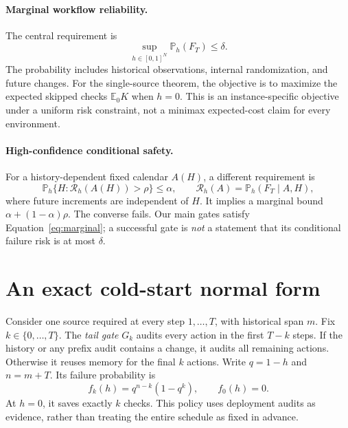 \documentclass{article}
\newcommand{\Pp}{\mathbb P}
\newcommand{\Ee}{\mathbb E}
\newcommand{\1}{\mathbf 1}
\newcommand{\risk}{\mathcal R}
\begin{document}
\paragraph{Marginal workflow reliability.}
The central requirement is
\begin{equation}
\sup_{h\in[0,1]^N}\Pp_h(F_T)\leq\delta.\label{eq:marginal}
\end{equation}
The probability includes historical observations, internal randomization, and future changes. For the single-source theorem, the objective is to maximize the expected skipped checks $\Ee_0 K$ when $h=0$. This is an instance-specific objective under a uniform risk constraint, not a minimax expected-cost claim for every environment.

\paragraph{High-confidence conditional safety.}
For a history-dependent fixed calendar $A(H)$, a different requirement is
\begin{equation}
\Pp_h\{H:\risk_h(A(H))>\rho\}\leq\alpha,
\qquad \risk_h(A)=\Pp_h(F_T\mid A,H),\label{eq:conditional}
\end{equation}
where future increments are independent of $H$. It implies a marginal bound $\alpha+(1-\alpha)\rho$. The converse fails. Our main gates satisfy Equation~\eqref{eq:marginal}; a successful gate is \emph{not} a statement that its conditional failure risk is at most $\delta$.

\section{An exact cold-start normal form}\label{sec:normal}
Consider one source required at every step $1,\ldots,T$, with historical span $m$. Fix $k\in\{0,\ldots,T\}$. The \emph{tail gate} $G_k$ audits every action in the first $T-k$ steps. If the history or any prefix audit contains a change, it audits all remaining actions. Otherwise it reuses memory for the final $k$ actions. Write $q=1-h$ and $n=m+T$. Its failure probability is
\begin{equation}
 f_k(h)=q^{n-k}(1-q^k),\qquad f_0(h)=0.\label{eq:tail}
\end{equation}
At $h=0$, it saves exactly $k$ checks. This policy uses deployment audits as evidence, rather than treating the entire schedule as fixed in advance.
\end{document}
